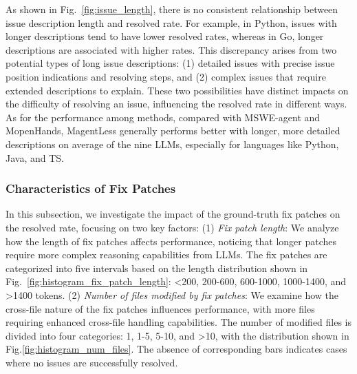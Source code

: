 \documentclass[11pt, a4paper, logo, copyright, nonumbering]{seed}
\newcommand{\msweagent}{MSWE-agent\xspace}
\begin{document}
As shown in Fig.~\ref{fig:issue_length}, there is no consistent relationship between issue description length and resolved rate.
For example, in Python, issues with longer descriptions tend to have lower resolved rates, whereas in Go, longer descriptions are associated with higher rates.
This discrepancy arises from two potential types of long issue descriptions: (1) detailed issues with precise issue position indications and resolving steps, and (2) complex issues that require extended descriptions to explain. 
These two possibilities have distinct impacts on the difficulty of resolving an issue, influencing the resolved rate in different ways.
As for the performance among methods, compared with MSWE-agent and MopenHands, MagentLess generally performs better with longer, more detailed descriptions on average of the nine LLMs, especially for languages like Python, Java, and TS.

\subsubsection{Characteristics of Fix Patches}

In this subsection, we investigate the impact of the ground-truth fix patches on the resolved rate, focusing on two key factors: 
(1) \emph{Fix patch length}:
We analyze how the length of fix patches affects performance, noticing that longer patches require more complex reasoning capabilities from LLMs. 
The fix patches are categorized into five intervals based on the length distribution shown in Fig.~\ref{fig:histogram_fix_patch_length}: <200, 200-600, 600-1000, 1000-1400, and >1400 tokens.
(2) \emph{Number of files modified by fix patches}: We examine how the cross-file nature of the fix patches influences performance, with more files requiring enhanced cross-file handling capabilities. The number of modified files is divided into four categories: 1, 1-5, 5-10, and >10, with the distribution shown in Fig.\ref{fig:histogram_num_files}.
The absence of corresponding bars indicates cases where no issues are successfully resolved.
\end{document}
